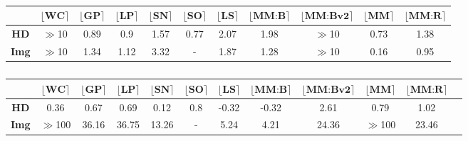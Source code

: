 \documentclass[final]{beamer}
\newlength{\colwidth}
\begin{document}
\begin{frame}[t]
\begin{columns}[t]
\begin{column}{\colwidth}
\begin{block}{\noindent{}}
\begin{table}
\begin{subtable}{\linewidth}
\centering
\begin{tabular}{|c|c|c|c|c|c|c|c|c|c|c|}
\hline
 &                   $\lfloor \textbf{WC}\rceil$ &                  $\lfloor \textbf{GP}\rceil$ &                  $\lfloor \textbf{LP}\rceil$ &              $\lfloor \textbf{SN}\rceil$  & $\lfloor \textbf{SO}\rceil$  & $\lfloor \textbf{LS}\rceil$ & $\lfloor \textbf{MM:B}\rceil$ &  $\lfloor \textbf{MM:Bv2}\rceil$ & $\lfloor \textbf{MM}\rceil$ & $\lfloor \textbf{MM:R}\rceil$      \\ \hline
\bf{HD} &\color{red}$\gg$10  & \color{orange}0.89 &\color{orange}0.9 & \color{red}1.57 & \color{orange}0.77 & \color{red}2.07 & \color{red}1.98 & \color{red}$\gg$10& \color{orange}0.73& \color{red}1.38  \\ \hline
 \bf{Img} & \color{red}$\gg$10  & \color{red}1.34 &\color{orange}1.12 & \color{red}3.32 &  - & \color{red}1.87 & \color{red}1.28 &  \color{red}$\gg$10 & \color{ForestGreen}0.16& \color{orange}0.95  \\ \hline
\end{tabular}
\caption{}
\end{subtable}
\begin{subtable}{\linewidth}
\centering
\begin{tabular}{|c|c|c|c|c|c|c|c|c|c|c|}
\hline
 &                   $\lfloor \textbf{WC}\rceil$ &                  $\lfloor \textbf{GP}\rceil$ &                  $\lfloor \textbf{LP}\rceil$ &              $\lfloor \textbf{SN}\rceil$  & $\lfloor \textbf{SO}\rceil$  & $\lfloor \textbf{LS}\rceil$ & $\lfloor \textbf{MM:B}\rceil$ &  $\lfloor \textbf{MM:Bv2}\rceil$ & $\lfloor \textbf{MM}\rceil$ & $\lfloor \textbf{MM:R}\rceil$      \\ \hline
\bf{HD} &\color{red}0.36 & \color{orange}0.67 &\color{orange}0.69 & \color{red}0.12 & \color{orange}0.8 & \color{red}-0.32 & \color{red}-0.32 & \color{red}2.61& \color{orange}0.79& \color{LimeGreen}1.02  \\ \hline
 \bf{Img} &\color{red}$\gg$100 & \color{red}36.16 &\color{red}36.75 & \color{LimeGreen}13.26 &  - & \color{red}5.24 & \color{red}4.21 &\color{LimeGreen}24.36& \color{red}$\gg$100& \color{LimeGreen}23.46& \hline
\end{tabular}
\caption{}
\end{subtable}
\end{table}
\vspace{-5 mm}
\end{block}


\end{column}
\end{columns}
\end{frame}
\end{document}
